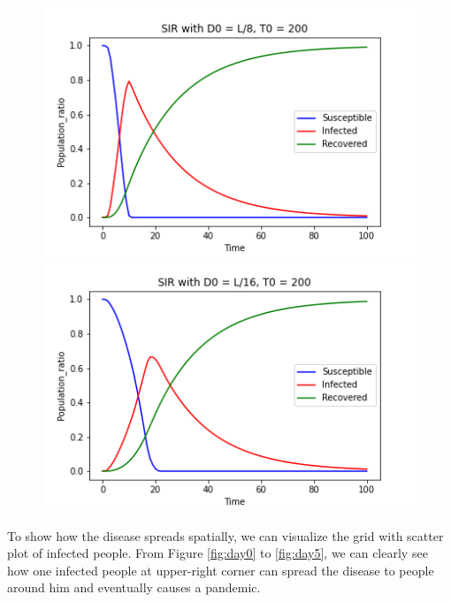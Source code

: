 \documentclass[12pt, reqno]{amsart}
\begin{document}
\begin{figure}[h]
\begin{minipage}[b]{0.45 \textwidth}
            \includegraphics[width=\textwidth]{./discrete/sir_discrete_grid2.png}
            \caption{}
            \label{fig:d=l/8}
        \end{minipage}
        \hfill
        \begin{minipage}[b]{0.45 \textwidth}
            \includegraphics[width=\textwidth]{./discrete/sir_discrete_grid8.png}
            \caption{}
            \label{fig:d=l/16}
        \end{minipage}
    \end{figure}
    
    To show how the disease spreads spatially, we can visualize the grid with scatter plot of infected people. From Figure \ref{fig:day0} to \ref{fig:day5}, we can clearly see how one infected people at upper-right corner can spread the disease to people around him and eventually causes a pandemic.  
    
\end{document}
